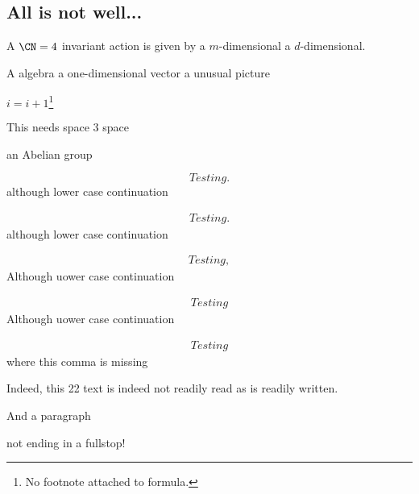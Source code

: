 \documentclass[reqno,a4paper,11pt]{article}
\let\fn\footnote
\renewcommand{\footnote}[1]{\linespread{1.1}\fn{#1}\linespread{1.29}}
\begin{document}
\subsection{All is not well...}

A $\CN=4$ invariant action is given by a $m$-dimensional a $d$-dimensional.

A algebra a one-dimensional vector a unusual picture

$i=i+1$\footnote{No footnote attached to formula.}

This needs space 3 space

an Abelian group

\begin{equation}
Testing .
\end{equation}
although lower case continuation

\begin{equation}
\begin{aligned}
Testing .
\end{aligned}
\end{equation}
although lower case continuation

\begin{equation}
\begin{gathered}
Testing ,
\end{gathered}
\end{equation}
Although uower case continuation

\begin{equation}
\begin{gathered}
Testing 
\end{gathered}
\end{equation}
Although uower case continuation

\begin{equation}
\begin{gathered}
Testing 
\end{gathered}
\end{equation}
where this comma is missing

Indeed, this 22 text is indeed not readily read as is readily written.

And a paragraph

not ending in a fullstop!




\end{document}
